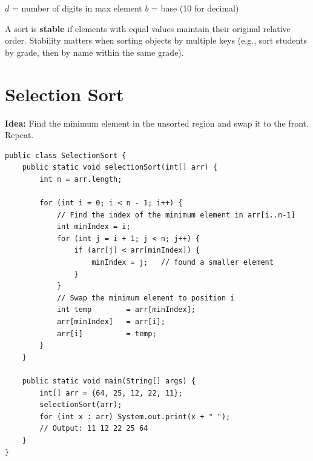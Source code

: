 \documentclass[12pt,a4paper,oneside]{book}
\begin{document}
{\small\color{mygray}$d$ = number of digits in max element \quad $b$ = base (10 for decimal)}

\begin{tipbox}
A sort is \textbf{stable} if elements with equal values maintain their original relative order. Stability matters when sorting objects by multiple keys (e.g., sort students by grade, then by name within the same grade).
\end{tipbox}

\section{Selection Sort}

\textbf{Idea:} Find the minimum element in the unsorted region and swap it to the front. Repeat.

\begin{center}
\end{center}

\begin{lstlisting}[caption={Selection Sort}]
public class SelectionSort {
    public static void selectionSort(int[] arr) {
        int n = arr.length;

        for (int i = 0; i < n - 1; i++) {
            // Find the index of the minimum element in arr[i..n-1]
            int minIndex = i;
            for (int j = i + 1; j < n; j++) {
                if (arr[j] < arr[minIndex]) {
                    minIndex = j;   // found a smaller element
                }
            }
            // Swap the minimum element to position i
            int temp        = arr[minIndex];
            arr[minIndex]   = arr[i];
            arr[i]          = temp;
        }
    }

    public static void main(String[] args) {
        int[] arr = {64, 25, 12, 22, 11};
        selectionSort(arr);
        for (int x : arr) System.out.print(x + " ");
        // Output: 11 12 22 25 64
    }
}
\end{lstlisting}
\end{document}
